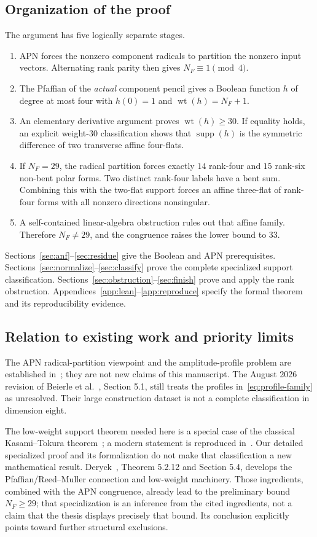 \documentclass[11pt,a4paper]{article}
\numberwithin{equation}{section}
\theoremstyle{definition}
\newcommand{\wt}{\operatorname{wt}}
\newcommand{\supp}{\operatorname{supp}}
\begin{document}
\subsection{Organization of the proof}
The argument has five logically separate stages.
\begin{enumerate}
\item APN forces the nonzero component radicals to partition the nonzero input vectors. Alternating rank parity then gives $N_F\equiv1\pmod4$.
\item The Pfaffian of the \emph{actual} component pencil gives a Boolean function $h$ of degree at most four with $h(0)=1$ and $\wt(h)=N_F+1$.
\item An elementary derivative argument proves $\wt(h)\ge30$. If equality holds, an explicit weight-$30$ classification shows that $\supp(h)$ is the symmetric difference of two transverse affine four-flats.
\item If $N_F=29$, the radical partition forces exactly $14$ rank-four and $15$ rank-six non-bent polar forms. Two distinct rank-four labels have a bent sum. Combining this with the two-flat support forces an affine three-flat of rank-four forms with all nonzero directions nonsingular.
\item A self-contained linear-algebra obstruction rules out that affine family. Therefore $N_F\ne29$, and the congruence raises the lower bound to $33$.
\end{enumerate}
Sections~\ref{sec:anf}--\ref{sec:residue} give the Boolean and APN prerequisites. Sections~\ref{sec:normalize}--\ref{sec:classify} prove the complete specialized support classification. Sections~\ref{sec:obstruction}--\ref{sec:finish} prove and apply the rank obstruction. Appendices~\ref{app:lean}--\ref{app:reproduce} specify the formal theorem and its reproducibility evidence.

\subsection{Relation to existing work and priority limits}
The APN radical-partition viewpoint and the amplitude-profile problem are established in~\cite{BGKV}; they are not new claims of this manuscript. The August 2026 revision of Beierle et al.~\cite{BLLPR}, Section 5.1, still treats the profiles in~\eqref{eq:profile-family} as unresolved. Their large construction dataset is not a complete classification in dimension eight.

The low-weight support theorem needed here is a special case of the classical Kasami--Tokura theorem~\cite{KT}; a modern statement is reproduced in~\cite{Ye}. Our detailed specialized proof and its formalization do not make that classification a new mathematical result. Deryck~\cite{Deryck}, Theorem 5.2.12 and Section 5.4, develops the Pfaffian/Reed--Muller connection and low-weight machinery. Those ingredients, combined with the APN congruence, already lead to the preliminary bound $N_F\ge29$; that specialization is an inference from the cited ingredients, not a claim that the thesis displays precisely that bound. Its conclusion explicitly points toward further structural exclusions.
\end{document}
